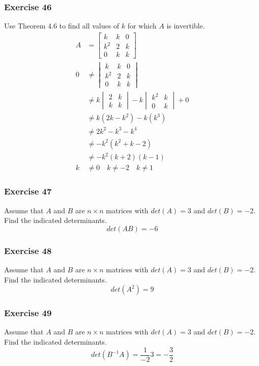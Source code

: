 \documentclass{math}
\begin{document}
\subsubsection*{Exercise 46}
Use Theorem 4.6 to find all values of \( k \) for which \( A \) is invertible.
\begin{align*}
  A &= \begin{bmatrix}
    k & k & 0 \\
    k^2 & 2 & k \\
    0 & k & k
  \end{bmatrix} \\
  0 &\ne \begin{vmatrix}
    k & k & 0 \\
    k^2 & 2 & k \\
    0 & k & k
  \end{vmatrix} \\
  &\ne k\begin{vmatrix}2 & k \\ k & k\end{vmatrix}-
    k\begin{vmatrix}k^2 & k \\ 0 & k\end{vmatrix}+0 \\
  &\ne k(2k-k^2)-k(k^3) \\
  &\ne 2k^2-k^3-k^4 \\
  &\ne -k^2(k^2+k-2) \\
  &\ne -k^2(k+2)(k-1) \\
  k &\ne 0 \quad k\ne-2 \quad k\ne1
\end{align*}

\subsubsection*{Exercise 47}
Assume that \( A \) and \( B \) are \( n\times n \) matrices with
\( det(A) = 3 \) and \( det(B) = -2 \). Find the indicated determinants.
\[ det(AB) = -6 \]

\subsubsection*{Exercise 48}
Assume that \( A \) and \( B \) are \( n\times n \) matrices with
\( det(A) = 3 \) and \( det(B) = -2 \). Find the indicated determinants.
\[ det(A^2) = 9 \]

\subsubsection*{Exercise 49}
Assume that \( A \) and \( B \) are \( n\times n \) matrices with
\( det(A) = 3 \) and \( det(B) = -2 \). Find the indicated determinants.
\[ det(B^{-1}A) = \frac{1}{-2}3 = -\frac{3}{2} \]
\end{document}
